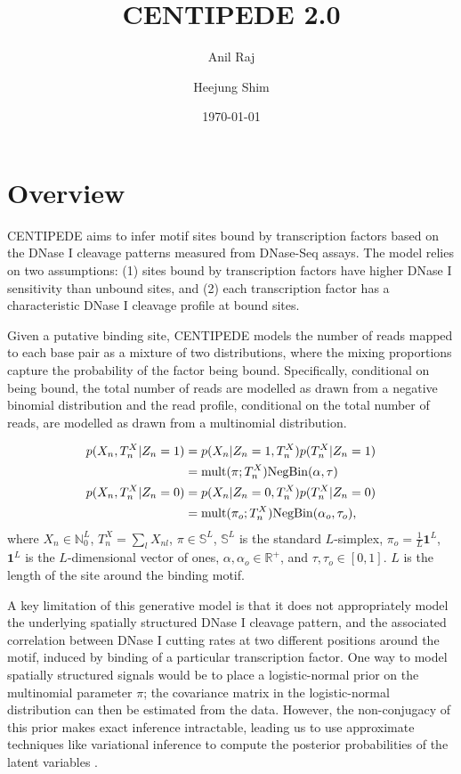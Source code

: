 \documentclass[reqno]{amsart}
\numberwithin{equation}{section}
\begin{document}
\title{CENTIPEDE 2.0}

\author{Anil Raj}
\author{Heejung Shim}

\date{\today}

\maketitle

\section{Overview}
CENTIPEDE aims to infer motif sites bound by transcription factors based on the DNase I cleavage patterns
measured from DNase-Seq assays. The model relies on two assumptions: (1) sites bound by transcription
factors have higher DNase I sensitivity than unbound sites, and (2) each transcription factor has a 
characteristic DNase I cleavage profile at bound sites.

Given a putative binding site, CENTIPEDE models the number of reads mapped to each base pair as a mixture
of two distributions, where the mixing proportions capture the probability of the factor being bound.
Specifically, conditional on being bound, the total number of reads are modelled as drawn from a 
negative binomial distribution and the read profile, conditional on the total number of reads, are 
modelled as drawn from a multinomial distribution.

\begin{align}
    p(X_n, T^X_n | Z_n=1) 
        & = p(X_n | Z_n=1, T^X_n) p(T^X_n | Z_n=1) \\
        & = \mathrm{mult}(\pi; T^X_n) \mathrm{NegBin}(\alpha, \tau) \\
    p(X_n, T^X_n | Z_n=0)
        & = p(X_n | Z_n=0, T^X_n) p(T^X_n | Z_n=0) \\
        & = \mathrm{mult}(\pi_o; T^X_n) \mathrm{NegBin}(\alpha_o, \tau_o),
\end{align}
where $X_n \in \mathbb{N}_0^L$, $T^X_n = \sum_l X_{nl}$, $\pi \in \mathbb{S}^L$, $\mathbb{S}^L$ is the standard $L$-simplex, $\pi_o = \frac{1}{L}\mathbf{1}^L$, $\mathbf{1}^L$ is the $L$-dimensional vector of ones, $\alpha, \alpha_o \in \mathbb{R}^+$, and $\tau, \tau_o \in [0,1]$. $L$ is the length of the site around the binding motif.

A key limitation of this generative model is that it does not appropriately model the underlying spatially 
structured DNase I cleavage pattern, and the associated correlation between DNase I cutting rates at two 
different positions around the motif, induced by binding of a particular transcription factor. 
One way to model spatially structured signals would be to place 
a logistic-normal prior on the multinomial parameter $\pi$; the covariance matrix in the logistic-normal 
distribution can then be estimated from the data. However, the non-conjugacy of this prior makes exact 
inference intractable, leading us to use approximate techniques like variational inference to compute the 
posterior probabilities of the latent variables .
\end{document}
